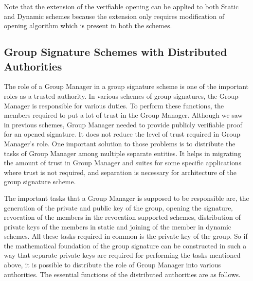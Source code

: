 Note that the extension of the verifiable opening can be applied to both Static and Dynamic schemes because the extension only requires modification of opening algorithm which is present in both the schemes.

\subsection{Group Signature Schemes with Distributed Authorities}\label{sec:Group Signature Schemes with Distributed Authorities}
The role of a Group Manager in a group signature scheme is one of the important roles as a trusted authority. In various schemes of group signatures, the Group Manager is responsible for various duties. To perform these functions, the members required to put a lot of trust in the Group Manager. Although we saw in previous schemes, Group Manager needed to provide publicly verifiable proof for an opened signature. It does not reduce the level of trust required in Group Manager's role. One important solution to those problems is to distribute the tasks of Group Manager among multiple separate entities. It helps in migrating the amount of trust in Group Manager and suites for some specific applications where trust is not required, and separation is necessary for architecture of the group signature scheme. 

The important tasks that a Group Manager is supposed to be responsible are, the generation of the private and public key of the group, opening the signature, revocation of the members in the revocation supported schemes, distribution of private keys of the members in static and joining of the member in dynamic schemes. All these tasks required in common is the private key of the group. So if the mathematical foundation of the group signature can be constructed in such a way that separate private keys are required for performing the tasks mentioned above, it is possible to distribute the role of Group Manager into various authorities. The essential functions of the distributed authorities are as follows.

